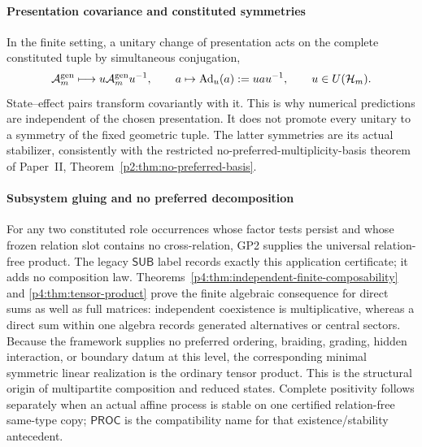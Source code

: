 \documentclass[12pt,a4paper]{article}
\begin{document}
\paragraph{Presentation covariance and constituted symmetries}
\label{p4:sec:part1-native-covariance}

In the finite setting, a unitary change of presentation acts on the complete
constituted tuple by simultaneous conjugation,
\begin{equation}
\label{p4:eq:part1-inner}
\mathcal A_m^{\mathrm{gen}}\longmapsto
u\mathcal A_m^{\mathrm{gen}}u^{-1},
\qquad a\mapsto\operatorname{Ad}_u(a):=uau^{-1},
\qquad u\in U(\mathcal H_m).
\end{equation}
State--effect pairs transform covariantly with it.  This is why numerical
predictions are independent of the chosen presentation.  It does not promote
every unitary to a symmetry of the fixed geometric tuple.  The latter
symmetries are its actual stabilizer, consistently with the restricted
no-preferred-multiplicity-basis theorem of Paper~II,
Theorem~\ref{p2:thm:no-preferred-basis}.



\paragraph{Subsystem gluing and no preferred decomposition}
\label{p4:sec:part1-native-gluing}

For any two constituted role occurrences whose factor tests persist and whose
frozen relation slot contains no cross-relation, GP2 supplies the universal
relation-free product.  The legacy \(\mathsf{SUB}\) label records exactly this
application certificate; it adds no composition law.
Theorems~\ref{p4:thm:independent-finite-composability} and
\ref{p4:thm:tensor-product} prove the finite algebraic consequence for direct
sums as well as full matrices: independent coexistence is multiplicative,
whereas a direct sum within one algebra records generated alternatives or
central sectors.
Because the framework supplies no preferred ordering, braiding, grading, hidden interaction, or boundary datum at this level, the corresponding minimal symmetric linear realization is the ordinary tensor product.
This is the structural origin of multipartite composition and reduced states.
Complete positivity follows separately when an actual affine process is stable
on one certified relation-free same-type copy; \(\mathsf{PROC}\) is the
compatibility name for that existence/stability antecedent.
\end{document}
